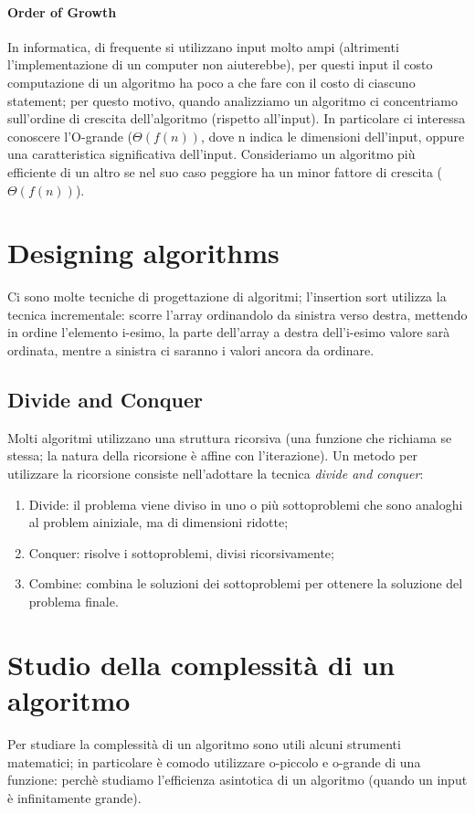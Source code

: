 \documentclass{article}
\begin{document}
\paragraph{Order of Growth}
In informatica, di frequente si utilizzano input molto ampi (altrimenti
l'implementazione di un computer non aiuterebbe), per questi input il costo
computazione di un algoritmo ha poco a che fare con il costo di ciascuno
statement; per questo motivo, quando analizziamo un algoritmo ci concentriamo
sull'ordine di crescita dell'algoritmo (rispetto all'input). In particolare ci
interessa conoscere l'O-grande ($\Theta(f(n))$, dove n indica le dimensioni
dell'input, oppure una caratteristica significativa dell'input.
Consideriamo un algoritmo più efficiente di un altro se nel suo caso peggiore ha
un minor fattore di crescita ($\Theta(f(n))$).

\section{Designing algorithms}
Ci sono molte tecniche di progettazione di algoritmi; l'insertion
sort utilizza la tecnica incrementale: scorre l'array ordinandolo da sinistra
verso destra, mettendo in ordine l'elemento i-esimo, la parte dell'array a
destra dell'i-esimo valore sarà ordinata, mentre a sinistra ci saranno i valori
ancora da ordinare.

\subsection{Divide and Conquer}
Molti algoritmi utilizzano una struttura ricorsiva (una funzione che richiama se
stessa; la natura della ricorsione è affine con l'iterazione). Un metodo per
utilizzare la ricorsione consiste nell'adottare la tecnica \textit{divide and
conquer}: 
\begin{enumerate}
    \item Divide: il problema viene diviso in uno o più sottoproblemi che sono 
        analoghi al problem ainiziale, ma di dimensioni ridotte;
    \item Conquer: risolve i sottoproblemi, divisi ricorsivamente;
    \item Combine: combina le soluzioni dei sottoproblemi per ottenere la
        soluzione del problema finale.
\end{enumerate}

\section{Studio della complessità di un algoritmo}
Per studiare la complessità di un algoritmo sono utili alcuni strumenti
matematici; in particolare è comodo utilizzare o-piccolo e o-grande di una
funzione: perchè studiamo l'efficienza asintotica di un algoritmo (quando un
input è infinitamente grande).
\end{document}
